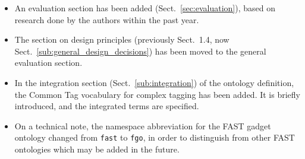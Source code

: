 \documentclass{article}
\begin{document}
\begin{itemize}
	\item An evaluation section has been added (Sect.~\ref{sec:evaluation}), based on research done by the authors within the past year.
	\item The section on design principles (previously Sect.~1.4, now Sect.~\ref{sub:general_design_decisions}) has been moved to the general evaluation section.
	\item In the integration section (Sect.~\ref{sub:integration}) of the ontology definition, the Common Tag vocabulary for complex tagging has been added. It is briefly introduced, and the integrated terms are specified.
	\item On a technical note, the namespace abbreviation for the FAST gadget ontology changed from \texttt{fast} to \texttt{fgo}, in order to distinguish from other FAST ontologies which may be added in the future.
\end{itemize}



\singlespacing
\clearpage
{}


\end{document}
